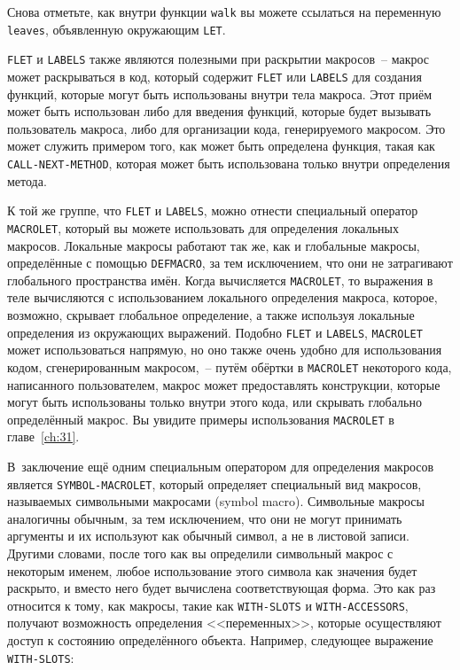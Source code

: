 Снова отметьте, как внутри функции \lstinline{walk} вы можете ссылаться на переменную
\lstinline{leaves}, объявленную окружающим \lstinline{LET}.

\lstinline{FLET} и \lstinline{LABELS} также являются полезными при раскрытии макросов~-- макрос
может раскрываться в код, который содержит \lstinline{FLET} или \lstinline{LABELS} для создания
функций, которые могут быть использованы внутри тела макроса.  Этот приём может быть
использован либо для введения функций, которые будет вызывать пользователь макроса, либо
для организации кода, генерируемого макросом.  Это может служить примером того, как может
быть определена функция, такая как \lstinline{CALL-NEXT-METHOD}, которая может быть
использована только внутри определения метода.

К той же группе, что \lstinline{FLET} и \lstinline{LABELS}, можно отнести специальный оператор
\lstinline{MACROLET}, который вы можете использовать для определения локальных
макросов. Локальные макросы работают так же, как и глобальные макросы, определённые с
помощью \lstinline{DEFMACRO}, за тем исключением, что они не затрагивают глобального
пространства имён.  Когда вычисляется \lstinline{MACROLET}, то выражения в теле вычисляются с
использованием локального определения макроса, которое, возможно, скрывает глобальное
определение, а также используя локальные определения из окружающих выражений.  Подобно
\lstinline{FLET} и \lstinline{LABELS}, \lstinline{MACROLET} может использоваться напрямую, но оно также
очень удобно для использования кодом, сгенерированным макросом,~-- путём обёртки в
\lstinline{MACROLET} некоторого кода, написанного пользователем, макрос может предоставлять
конструкции, которые могут быть использованы только внутри этого кода, или скрывать
глобально определённый макрос.  Вы увидите примеры использования \lstinline{MACROLET} в
главе~\ref{ch:31}.

В~заключение ещё одним специальным оператором для определения макросов является
\lstinline{SYMBOL-MACROLET}, который определяет специальный вид макросов, называемых
символьными макросами (symbol macro).  Символьные макросы аналогичны обычным, за тем
исключением, что они не могут принимать аргументы и их используют как обычный символ, а
не в листовой записи.  Другими словами, после того как вы определили символьный макрос с
некоторым именем, любое использование этого символа как значения будет раскрыто, и вместо
него будет вычислена соответствующая форма.  Это как раз относится к тому, как макросы,
такие как \lstinline{WITH-SLOTS} и \lstinline{WITH-ACCESSORS}, получают возможность определения
<<переменных>>, которые осуществляют доступ к состоянию определённого объекта.  Например,
следующее выражение \lstinline{WITH-SLOTS}:

